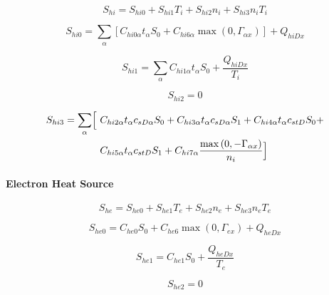 \documentclass[a4paper,10pt]{report}
\begin{document}
\begin{equation}
S_{hi}=S_{hi0}+S_{hi1}T_{i}+S_{hi2}n_{i}+S_{hi3}n_{i}T_{i}   \label{75}
\end{equation}

\begin{equation}
S_{hi0}=\sum_{\alpha}\left[ C_{hi0\alpha}t_{\alpha}S_{0}+C_{hi6\alpha}
\max\left( 0,\Gamma_{\alpha x}\right) \right] +Q_{hiDx}   \label{76}
\end{equation}

\begin{equation}
S_{hi1}=\sum_{\alpha}C_{hi1\alpha}t_{\alpha}S_{0}+\frac{Q_{hiDx}}{T_{i}}   \label{77}
\end{equation}

\begin{equation}
S_{hi2}=0   \label{78}
\end{equation}

\begin{equation}\begin{split}
S_{hi3}=\sum_{\alpha}\Bigl[ ~ & C_{hi2\alpha}t_{\alpha}c_{sD\alpha}S_{0}+C_{hi3\alpha}
t_{\alpha}c_{sD\alpha}S_{1}+C_{hi4\alpha}t_{\alpha}c_{stD}S_{0}+ \\
~ & C_{hi5\alpha}t_{\alpha}c_{stD}S_{1}+C_{hi7\alpha}
\frac{\max\left(0,-\Gamma_{\alpha x}\right) }{n_{i}}\Bigr]   \label{79}
\end{split}\end{equation}

\paragraph{\protect\bigskip Electron Heat Source}

\begin{equation}
S_{he}=S_{he0}+S_{he1}T_{e}+S_{he2}n_{e}+S_{he3}n_{e}T_{e}   \label{80}
\end{equation}

\begin{equation}
S_{he0}=C_{he0}S_{0}+C_{he6}\max\left( 0,\Gamma_{ex}\right) +Q_{heDx}
\label{81}
\end{equation}

\begin{equation}
S_{he1}=C_{he1}S_{0}+\frac{Q_{heDx}}{T_{e}}   \label{82}
\end{equation}

\begin{equation}
S_{he2}=0   \label{83}
\end{equation}
\end{document}
